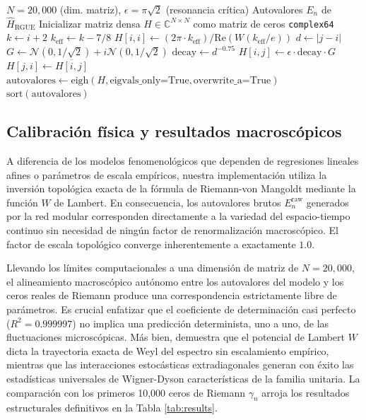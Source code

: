 \documentclass[aps,prl,preprint,superscriptaddress,floatfix]{revtex4-2}
\begin{document}
\begin{algorithm}[H]
\caption{Generación del ensamble Riemann-GUE libre de parámetros}
\label{alg:hamiltonian}
\begin{algorithmic}
\Require $N=20,000$ (dim. matriz), $\epsilon=\pi\sqrt{2}$ (resonancia crítica)
\Ensure Autovalores $E_n$ de $\hat{H}_{\text{RGUE}}$
\State Inicializar matriz densa $H \in \mathbb{C}^{N \times N}$ como matriz de ceros \texttt{complex64}
    \State $k \gets i+2$
    \State $k_{\text{eff}} \gets k - 7/8$ 
    \State $H[i,i] \gets (2\pi \cdot k_{\text{eff}}) / \text{Re}(W(k_{\text{eff}}/e))$ 
        \State $d \gets |j-i|$
         
            \State $G \gets \mathcal{N}(0, 1/\sqrt{2}) + i\mathcal{N}(0, 1/\sqrt{2})$ 
            \State $\text{decay} \gets d^{-0.75}$ 
            \State $H[i,j] \gets \epsilon \cdot \text{decay} \cdot G$
            \State $H[j,i] \gets \overline{H[i,j]}$ 
        \EndIf
    \EndFor
\EndFor
\State $\text{autovalores} \gets \text{eigh}(H, \text{eigvals\_only=True}, \text{overwrite\_a=True})$
\State \Return $\text{sort}(\text{autovalores})$
\end{algorithmic}
\end{algorithm}

\subsection{Calibración física y resultados macroscópicos}
A diferencia de los modelos fenomenológicos que dependen de regresiones lineales afines o parámetros de escala empíricos, nuestra implementación utiliza la inversión topológica exacta de la fórmula de Riemann-von Mangoldt mediante la función $W$ de Lambert. En consecuencia, los autovalores brutos $E_n^{\text{raw}}$ generados por la red modular corresponden directamente a la variedad del espacio-tiempo continuo sin necesidad de ningún factor de renormalización macroscópico. El factor de escala topológico converge inherentemente a exactamente $1.0$.

Llevando los límites computacionales a una dimensión de matriz de $N=20,000$, el alineamiento macroscópico autónomo entre los autovalores del modelo y los ceros reales de Riemann produce una correspondencia estrictamente libre de parámetros. Es crucial enfatizar que el coeficiente de determinación casi perfecto ($R^2 = 0.999997$) no implica una predicción determinista, uno a uno, de las fluctuaciones microscópicas. Más bien, demuestra que el potencial de Lambert $W$ dicta la trayectoria exacta de Weyl del espectro sin escalamiento empírico, mientras que las interacciones estocásticas extradiagonales generan con éxito las estadísticas universales de Wigner-Dyson características de la familia unitaria. La comparación con los primeros 10,000 ceros de Riemann $\gamma_n$ arroja los resultados estructurales definitivos en la Tabla \ref{tab:results}.
\end{document}
